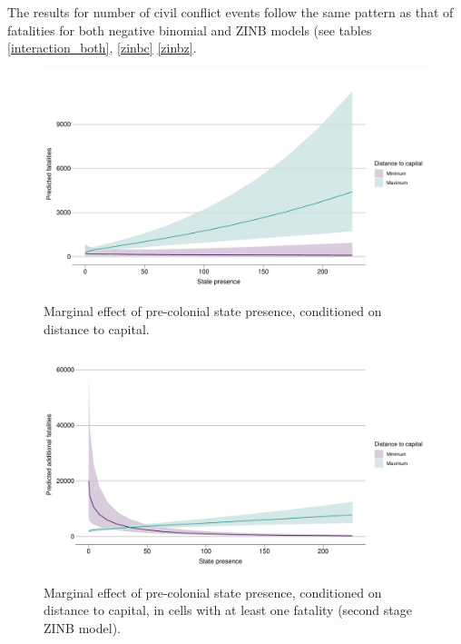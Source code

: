 \documentclass[12pt]{article}
\begin{document}
The results for number of civil conflict events follow the same pattern as that
of fatalities for both negative binomial and ZINB models (see tables
\ref{interaction_both}, \ref{zinbc} \ref{zinbz}.


\begin{figure}[htpb] \centering
	\includegraphics[width=\linewidth]{"../R/Output/deathsInterPlot.pdf"}
	\caption{Marginal effect of pre-colonial state presence, conditioned on
	distance to capital.}
	\label{interdeaths}
\end{figure}

\begin{figure}[htpb]
	\centering
	\includegraphics[width=\linewidth]{"../R/Output/interdeathszinbplot.pdf"}
	\caption{Marginal effect of pre-colonial state presence, conditioned on
	distance to capital, in cells with at least one fatality (second stage
ZINB model).}
	\label{deaths_zinb}
\end{figure}
\end{document}
